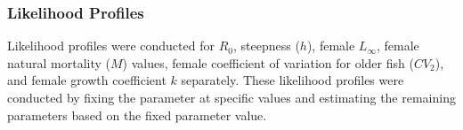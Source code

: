 \documentclass[11pt,
  english,
  a4paper,
]{article}
\begin{document}
\leavevmode\tagmcend\tagstructend\par


\hypertarget{likelihood-profiles}{%
\subsubsection{Likelihood Profiles}\label{likelihood-profiles}}

\leavevmode\tagmcend\tagstructend


Likelihood profiles were conducted for {\(R_0\)\leavevmode\tagmcend\tagstructend}, steepness ({\(h\)\leavevmode\tagmcend\tagstructend}), female {\(L_{\infty}\)\leavevmode\tagmcend\tagstructend}, female natural mortality ({\(M\)\leavevmode\tagmcend\tagstructend}) values, female coefficient of variation for older fish ({\(CV_2\)\leavevmode\tagmcend\tagstructend}), and female growth coefficient {\(k\)\leavevmode\tagmcend\tagstructend} separately. These likelihood profiles were conducted by fixing the parameter at specific values and estimating the remaining parameters based on the fixed parameter value.

\leavevmode\tagmcend\tagstructend\par

\end{document}
